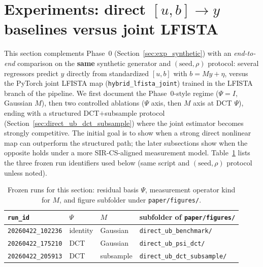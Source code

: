 
\section{Experiments: direct $[u,b]\to y$ baselines versus joint LFISTA}
\label{sec:exp_direct_ub}

This section complements Phase~0 (Section~\ref{sec:exp_synthetic}) with an \emph{end-to-end} comparison on the \textbf{same} synthetic generator and $(\mathrm{seed},\rho)$ protocol: several regressors predict $y$ directly from standardized $[u,b]$ with $b=My+\eta$, versus the PyTorch joint LFISTA map (\texttt{hybrid\_lfista\_joint}) trained in the LFISTA branch of the pipeline.
We first document the Phase~0-style regime ($\Psi=I$, Gaussian $M$), then two controlled ablations ($\Psi$ axis, then $M$ axis at DCT $\Psi$), ending with a structured DCT$+$subsample protocol (Section~\ref{sec:direct_ub_dct_subsample}) where the joint estimator becomes strongly competitive.
The initial goal is to show when a strong direct nonlinear map can outperform the structured path; the later subsections show when the opposite holds under a more SIR-CS-aligned measurement model.
Table~\ref{tab:direct_ub_run_card} lists the three frozen run identifiers used below (same script and $(\mathrm{seed},\rho)$ protocol unless noted).

\begin{table}[t]
  \centering
  \caption{Frozen runs for this section: residual basis $\Psi$, measurement operator kind for $M$, and figure subfolder under \texttt{paper/figures/}.}
  \label{tab:direct_ub_run_card}
  \small
  \begin{tabular}{@{}llll@{}}
    \toprule
    \texttt{run\_id} & $\Psi$ & $M$ & subfolder of \texttt{paper/figures/} \\
    \midrule
    \texttt{20260422\_102236} & identity & Gaussian & \texttt{direct\_ub\_benchmark/} \\
    \texttt{20260422\_175210} & DCT & Gaussian & \texttt{direct\_ub\_psi\_dct/} \\
    \texttt{20260422\_205913} & DCT & subsample & \texttt{direct\_ub\_dct\_subsample/} \\
    \bottomrule
  \end{tabular}
\end{table}

